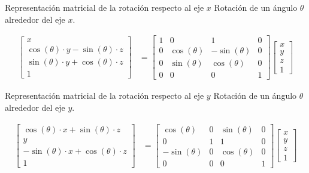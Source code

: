 \documentclass[a4paper, twoside]{article}
\begin{document}
\begin{definicion*}{Representación matricial de la rotación respecto al eje $x$}
	Rotación de un ángulo $\theta$ alrededor del eje $x$.

	\begin{align*}
		\begin{bmatrix}
			x \\
			\cos(\theta) \cdot y - \sin(\theta) \cdot z \\
			\sin(\theta) \cdot y + \cos(\theta) \cdot z \\
			1
		\end{bmatrix} &=
		\begin{bmatrix}
			1 & 0            & 1             & 0 \\
			0 & \cos(\theta) & -\sin(\theta) & 0 \\
			0 & \sin(\theta) & \cos(\theta)  & 0 \\
			0 & 0            & 0             & 1
		\end{bmatrix}
		\begin{bmatrix}
			x \\
			y \\
			z \\
			1
		\end{bmatrix}
	\end{align*}
\end{definicion*}

\begin{definicion*}{Representación matricial de la rotación respecto al eje $y$}
	Rotación de un ángulo $\theta$ alrededor del eje $y$.

	\begin{align*}
		\begin{bmatrix}
			\cos(\theta) \cdot x + \sin(\theta) \cdot z \\
			y \\
			- \sin(\theta) \cdot x + \cos(\theta) \cdot z \\
			1
		\end{bmatrix} &=
		\begin{bmatrix}
			\cos(\theta)  & 0 & \sin(\theta) & 0 \\
			0             & 1 & 1            & 0 \\
			-\sin(\theta) & 0 & \cos(\theta) & 0 \\
			0             & 0 & 0            & 1
		\end{bmatrix}
		\begin{bmatrix}
			x \\
			y \\
			z \\
			1
		\end{bmatrix}
	\end{align*}
\end{definicion*}
\end{document}
